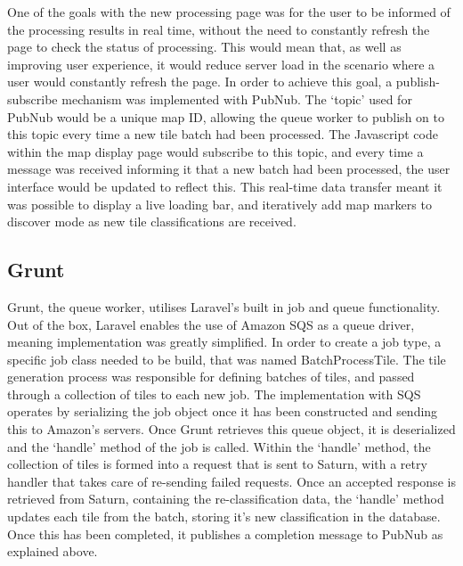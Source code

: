 One of the goals with the new processing page was for the user to be informed of the processing results in real time, without the need to constantly refresh the page to check the status of processing. This would mean that, as well as improving user experience, it would reduce server load in the scenario where a user would constantly refresh the page. In order to achieve this goal, a publish-subscribe mechanism was implemented with PubNub. The ‘topic’ used for PubNub would be a unique map ID, allowing the queue worker to publish on to this topic every time a new tile batch had been processed. The Javascript code within the map display page would subscribe to this topic, and every time a message was received informing it that a new batch had been processed, the user interface would be updated to reflect this. This real-time data transfer meant it was possible to display a live loading bar, and iteratively add map markers to discover mode as new tile classifications are received.

\subsection{Grunt}

Grunt, the queue worker, utilises Laravel’s built in job and queue functionality. Out of the box, Laravel enables the use of Amazon SQS as a queue driver, meaning implementation was greatly simplified. In order to create a job type, a specific job class needed to be build, that was named BatchProcessTile. The tile generation process was responsible for defining batches of tiles, and passed through a collection of tiles to each new job. The implementation with SQS operates by serializing the job object once it has been constructed and sending this to Amazon’s servers. Once Grunt retrieves this queue object, it is deserialized and the `handle’ method of the job is called. Within the `handle’ method, the collection of tiles is formed into a request that is sent to Saturn, with a retry handler that takes care of re-sending failed requests. Once an accepted response is retrieved from Saturn, containing the re-classification data, the `handle’ method updates each tile from the batch, storing it’s new classification in the database. Once this has been completed, it publishes a completion message to PubNub as explained above.

